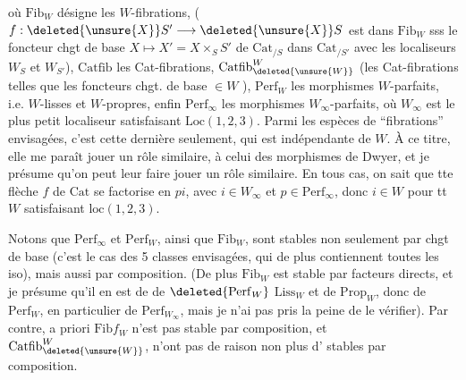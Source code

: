 où $\mathrm{Fib}_W$ désigne les $W$-fibrations,
($f:\deleted{\unsure{X}}S'\longrightarrow\deleted{\unsure{X}}S$ est dans $\mathrm{Fib}_W$ sss le foncteur
chgt de base $X\longmapsto X'=X\times_S S'$ de $\mathrm{Cat}_{/S}$ dans
$\mathrm{Cat}_{/S'}$   avec les localiseurs
$W_S$ et $W_{S'}$), $\mathrm{Catfib}$ les Cat-fibrations,
$\mathrm{Catfib}^{W}_{\deleted{\unsure{W}}}$ 
(les Cat-fibrations telles que les
foncteurs chgt. de base   $\in W$
),
$\mathrm{Perf}_W$ les morphismes $W$-parfaits, i.e.
$W$-lisses et $W$-propres, enfin $\mathrm{Perf}_\infty$ les
morphismes $W_\infty$-parfaits, où $W_\infty$ est
le plus petit localiseur satisfaisant
$\mathrm{Loc}(1,2,3)$. Parmi les  espèces de
``fibrations'' envisagées, c'est cette dernière
seulement,  qui est indépendante de $W$.
À ce titre, elle me paraît jouer un
rôle similaire,  à celui des morphismes
de Dwyer,  et je présume qu'on peut leur
faire jouer un rôle similaire. En tous
cas, on sait que tte flèche $f$ de $\mathrm{Cat}$ se factorise
en $pi$, avec $i\in W_\infty$ et $p\in\mathrm{Perf}_\infty$, donc
$i\in W$ pour tt $W$ satisfaisant $\mathrm{loc}(1,2,3)$. 

Notons  que $\mathrm{Perf}_\infty$ et $\mathrm{Perf}_W$, ainsi
que $\mathrm{Fib}_W$, sont stables non seulement par
chgt de base (c'est le cas des 5 classes
envisagées, qui de plus contiennent toutes
les iso), mais aussi par composition.
(De plus $\mathrm{Fib}_W$ est stable par facteurs
directs, et je présume qu'il en est de
 de $\deleted{\mathrm{Perf}_W}$ $\mathrm{Liss}_W$ et de $\mathrm{Prop}_W$, donc de
$\mathrm{Perf}_W$, en particulier de $\mathrm{Perf}_{W_\infty}$, mais
je n'ai pas pris la peine de le
vérifier). Par contre, a priori
$\mathrm{Fib}f_W$ n'est pas  stable par composition,
et $\mathrm{Catfib}^{W}_{\deleted{\unsure{W}}}$,   n'ont pas de
raison non plus d' 
stables par composition.

